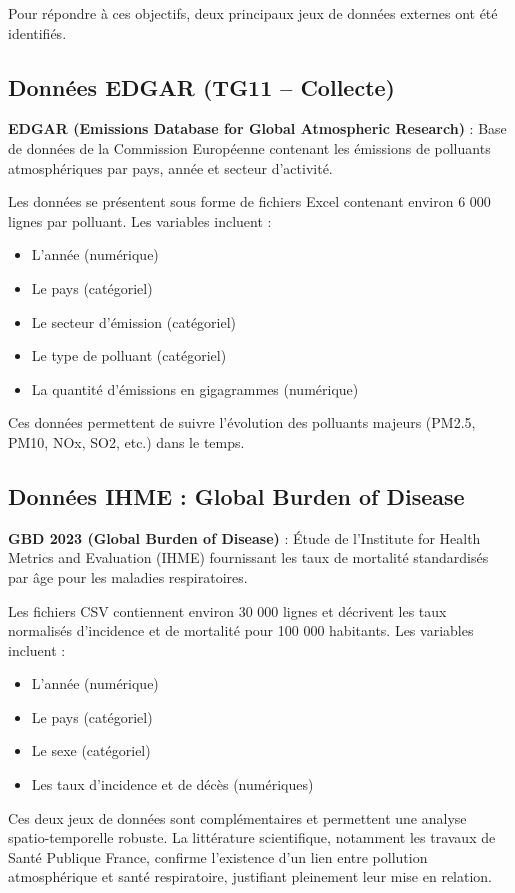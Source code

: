 \documentclass[11pt,a4paper]{article}
\begin{document}
Pour répondre à ces objectifs, deux principaux jeux de données externes ont été identifiés.

\subsection{Données EDGAR (TG11 -- Collecte)}

\textbf{EDGAR (Emissions Database for Global Atmospheric Research)} : Base de données de la Commission Européenne contenant les émissions de polluants atmosphériques par pays, année et secteur d'activité.

Les données se présentent sous forme de fichiers Excel contenant environ 6 000 lignes par polluant. Les variables incluent :
\begin{itemize}[noitemsep]
    \item L'année (numérique)
    \item Le pays (catégoriel)
    \item Le secteur d'émission (catégoriel)
    \item Le type de polluant (catégoriel)
    \item La quantité d'émissions en gigagrammes (numérique)
\end{itemize}

Ces données permettent de suivre l'évolution des polluants majeurs (PM2.5, PM10, NOx, SO2, etc.) dans le temps.

\subsection{Données IHME : Global Burden of Disease}

\textbf{GBD 2023 (Global Burden of Disease)} : Étude de l'Institute for Health Metrics and Evaluation (IHME) fournissant les taux de mortalité standardisés par âge pour les maladies respiratoires.

Les fichiers CSV contiennent environ 30 000 lignes et décrivent les taux normalisés d'incidence et de mortalité pour 100 000 habitants. Les variables incluent :
\begin{itemize}[noitemsep]
    \item L'année (numérique)
    \item Le pays (catégoriel)
    \item Le sexe (catégoriel)
    \item Les taux d'incidence et de décès (numériques)
\end{itemize}

Ces deux jeux de données sont complémentaires et permettent une analyse spatio-temporelle robuste. La littérature scientifique, notamment les travaux de Santé Publique France, confirme l'existence d'un lien entre pollution atmosphérique et santé respiratoire, justifiant pleinement leur mise en relation.
\end{document}

